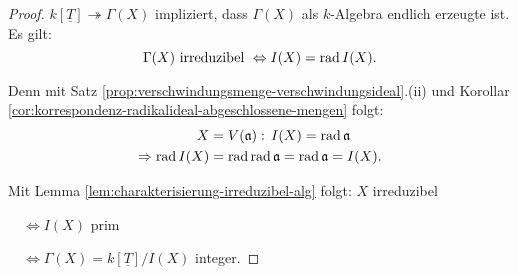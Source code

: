 \begin{proof}
  $k[\underline{T}]\twoheadrightarrow\Gamma(X)$ impliziert, dass $\Gamma(X)$ als $k$-Algebra endlich
  erzeugte ist. Es gilt:
  \[
    \Gamma(X)\text{ irreduzibel }\Leftrightarrow I(X)=\operatorname{rad} I(X).
  \]

  Denn mit Satz \ref{prop:verschwindungsmenge-verschwindungsideal}.(ii) und Korollar \ref{cor:korrespondenz-radikalideal-abgeschlossene-mengen} folgt:
  \begin{align*}
    X & =V(\mathfrak{a}):\,I(X)=\operatorname{rad}\mathfrak{a}\\
    \Rightarrow\operatorname{rad} I(X) & =\operatorname{rad}\operatorname{rad}\mathfrak{a}=\operatorname{rad}\mathfrak{a}=I(X).
  \end{align*}

  Mit Lemma \ref{lem:charakterisierung-irreduzibel-alg} folgt: $X$ irreduzibel

  $\phantom{\quad}\Leftrightarrow I(X)$ prim

  $\phantom{\quad}\Leftrightarrow\Gamma(X)=k[\underline{T}]/I(X)$ integer.
\end{proof}

